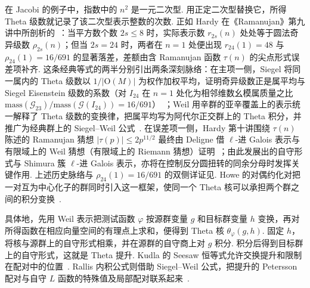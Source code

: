 在 Jacobi 的例子中，指数中的 $n^2$ 是一元二次型. 用正定二次型替换它，所得 Theta 级数就记录了该二次型表示整数的次数. 正如 Hardy 在《Ramanujan》第九讲中所剖析的~\cite{Hardy1940}：当平方数个数 $2s\le 8$ 时，实际表示数 $r_{2s}(n)$ 处处等于圆法奇异级数 $\rho_{2s}(n)$；但当 $2s=24$ 时，两者在 $n=1$ 处便出现 $r_{24}(1)=48$ 与 $\rho_{24}(1)=16/691$ 的显著落差，差额由含 Ramanujan 函数 $\tau(n)$ 的尖点形式误差项补齐. 这条经典等式的两半分别引出两条深刻脉络：在主项一侧，Siegel 将同一属内的 Theta 级数以 $1/|\mathrm O(M)|$ 为权作加权平均，证明奇异级数正是属平均与 Siegel Eisenstein 级数的系数（对 $I_{24}$ 在 $n=1$ 处化为相邻维数幺模属质量之比 $\mathrm{mass}(\mathcal G_{23})/\mathrm{mass}(\mathcal G(I_{24}))=16/691$）~\cite{Siegel1935,ConwaySloane1988,Li2023}；Weil 用辛群的亚辛覆盖上的表示统一解释了 Theta 级数的变换律，把属平均写为阿代尔正交群上的 Theta 积分，并推广为经典群上的 Siegel--Weil 公式~\cite{Weil1964,Weil1965,Weil1982}. 在误差项一侧，Hardy 第十讲围绕 $\tau(n)$ 陈述的 Ramanujan 猜想 $|\tau(p)|\le 2p^{11/2}$ 最终由 Deligne 借 $\ell$-进 Galois 表示与有限域上的 Weil 猜想（有限域上的 Riemann 猜想）证明~\cite{Deligne1971,Deligne1974}；由此发展出的自守形式与 Shimura 簇 $\ell$-进 Galois 表示，亦将在控制反分圆扭转的同余分母时发挥关键作用. 上述历史脉络与 $\rho_{24}(1)=16/691$ 的双侧详证见. Howe 的对偶约化对把一对互为中心化子的群同时引入这一框架，使同一个 Theta 核可以承担两个群之间的积分变换~\cite{Howe1979,Howe1989}.

具体地，先用 Weil 表示把测试函数 $\varphi$ 按源群变量 $g$ 和目标群变量 $h$ 变换，再对所得函数在相应向量空间的有理点上求和，便得到 Theta 核 $\theta_\varphi(g,h)$. 固定 $h$，将核与源群上的自守形式相乘，并在源群的自守商上对 $g$ 积分. 积分后得到目标群上的自守形式，这就是 Theta 提升. Kudla 的 Seesaw 恒等式允许交换提升和限制在配对中的位置~\cite{Kudla1984}. Rallis 内积公式则借助 Siegel--Weil 公式，把提升的 Petersson 配对与自守 $L$ 函数的特殊值及局部配对联系起来~\cite{Li1992,KudlaRallis1994,GQT2014}.

